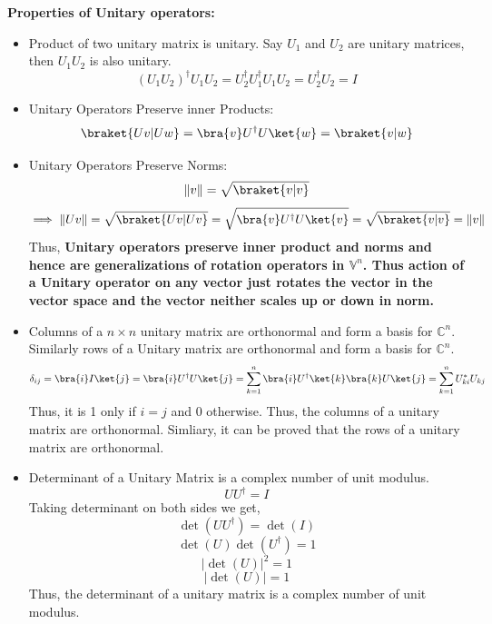\documentclass[12pt, oneside]{book}
\theoremstyle{definition}
\theoremstyle{definition}
\theoremstyle{remark}
\begin{document}
\textbf{Properties of Unitary operators: }
\begin{itemize}
    \item Product of two unitary matrix is unitary.
    Say $U_1$ and $U_2$ are unitary matrices, then $U_1U_2$ is also unitary.
    \[(U_1U_2)^{\dagger}U_1U_2=U_2^{\dagger}U_1^{\dagger}U_1U_2=U_2^{\dagger}U_2=I\]
    \item Unitary Operators Preserve inner Products:
    \[ \braket{Uv|Uw}=\bra{v}U^{\dagger}U\ket{w}=\braket{v|w} \]
    \item Unitary Operators Preserve Norms:
    \[ \|v\|=\sqrt{\braket{v|v}} \]
    \[ \implies \|Uv\|=\sqrt{\braket{Uv|Uv}}=\sqrt{\bra{v}U^{\dagger}U\ket{v}}=\sqrt{\braket{v|v}}=\|v\| \]
    Thus, \textbf{Unitary operators preserve inner product and norms and hence are generalizations of rotation operators in $\mathbb{V}^n$.
    Thus action of a Unitary operator on any vector just rotates the vector in the vector space and the vector neither scales up or down in norm.}
    \item Columns of a $n \times n$ unitary matrix are orthonormal and form a basis for $\mathbb{C}^n$.
    Similarly rows of a Unitary matrix are orthonormal and form a basis for $\mathbb{C}^n$.
    \[\delta_{ij}=\bra{i}I\ket{j}=\bra{i}U^{\dagger}U\ket{j}=\sum_{k=1}^n \bra{i}U^{\dagger}\ket{k}\bra{k}U\ket{j}=\sum_{k=1}^nU_{ki}^*U_{kj}\]
    Thus, it is 1 only if $i=j$ and 0 otherwise. Thus, the columns of a unitary matrix are orthonormal. Simliary, it can be 
    proved that the rows of a unitary matrix are orthonormal.
    \item Determinant of a Unitary Matrix is a complex number of unit modulus.
    \[ UU^{\dagger}=I\]
    Taking determinant on both sides we get,
    \[ \det(UU^{\dagger})=\det(I) \]
    \[ \det(U)\det(U^{\dagger})=1 \]
    \[ |\det(U)|^2=1\]
    \[ |\det(U)| = 1 \]
    Thus, the determinant of a unitary matrix is a complex number of unit modulus.
\end{itemize}
\end{document}
